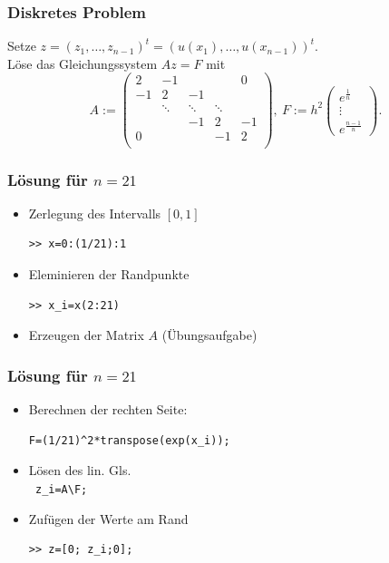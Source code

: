 %
%
\begin{frame}[fragile]\frametitle{Diskretes Problem}

Setze $z=(z_1,\dots ,z_{n-1})^t=(u(x_1), \dots ,u(x_{n-1}))^t$. \\

Löse das Gleichungssystem  $Az=F$  mit 
\[ A:= 
\left( \begin{array} {ccccccc}
 2 & -1 &  & &   0 \\
-1 & 2  & -1 &    & \\ 
   & \ddots & \ddots & \ddots   &\\
   & &  -1 & 2  & -1  \\ 
0 &  &    & -1 & 2 \\
\end{array} \right), \  F:=
h^2 \left( \begin{array}{c} e^\frac{1}{n}\\   \vdots \\ e^\frac{n-1}{n}
\end{array} \right) .
\] 
\end{frame}
%
%
\begin{frame}[fragile]\frametitle{Lösung für $n=21$}
\begin{itemize}
\item Zerlegung des Intervalls $[0,1]$
\begin{lstlisting}
>> x=0:(1/21):1
\end{lstlisting}
\item Eleminieren der Randpunkte
\begin{lstlisting}
>> x_i=x(2:21)
\end{lstlisting}
\item Erzeugen der Matrix $A$ (Übungsaufgabe)
\end{itemize}
\end{frame}
%
%
\begin{frame}[fragile]\frametitle{Lösung für $n=21$}
\begin{itemize}
\item Berechnen der rechten Seite:
\begin{lstlisting}
F=(1/21)^2*transpose(exp(x_i));
\end{lstlisting}
\item Lösen des lin. Gls.\\
\lstinline! z_i=A\F;!
\\
\item Zufügen der Werte am Rand
\begin{lstlisting}
>> z=[0; z_i;0];
\end{lstlisting}
\end{itemize}
\end{frame}
